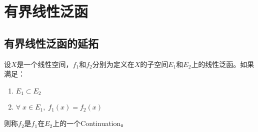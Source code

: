 \section{有界线性泛函}

\subsection{有界线性泛函的延拓}
\begin{definition}
	设$X$是一个线性空间，$f_1$和$f_2$分别为定义在$X$的子空间$E_1$和$E_2$上的线性泛函。如果满足：
	\begin{enumerate}
		\item $E_1\subset E_2$
		\item $\forall\;x\in E_1,\;f_1(x)=f_2(x)$
	\end{enumerate}
	则称$f_2$是$f_1$在$E_2$上的一个\gls{Continuation}。
\end{definition}

